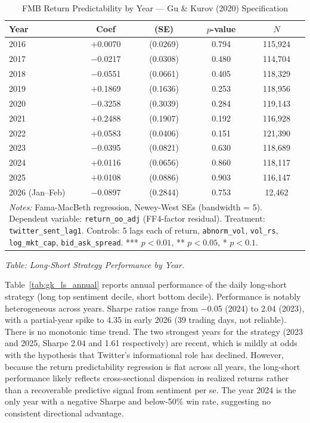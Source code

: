 \documentclass[12pt]{article}
\begin{document}
\begin{table}[htbp]
\centering
\caption{FMB Return Predictability by Year --- Gu \& Kurov (2020) Specification}
\label{tab:gk_fmb_annual}
\begin{tabular}{lcccc}
\hline\hline
Year & Coef & (SE) & $p$-value & $N$ \\
\hline
  2016 & $+$0.0070 & (0.0269) & 0.794 & 115,924 \\
  2017 & $-$0.0217 & (0.0308) & 0.480 & 114,704 \\
  2018 & $-$0.0551 & (0.0661) & 0.405 & 118,329 \\
  2019 & $+$0.1869 & (0.1636) & 0.253 & 118,956 \\
  2020 & $-$0.3258 & (0.3039) & 0.284 & 119,143 \\
  2021 & $+$0.2488 & (0.1907) & 0.192 & 116,928 \\
  2022 & $+$0.0583 & (0.0406) & 0.151 & 121,390 \\
  2023 & $-$0.0395 & (0.0821) & 0.630 & 118,689 \\
  2024 & $+$0.0116 & (0.0656) & 0.860 & 118,117 \\
  2025 & $+$0.0108 & (0.0886) & 0.903 & 116,147 \\
  2026 (Jan--Feb) & $-$0.0897 & (0.2844) & 0.753 & 12,462 \\
\hline\hline
\multicolumn{5}{p{0.9\linewidth}}{\footnotesize \textit{Notes:} Fama-MacBeth regression, Newey-West SEs (bandwidth = 5).
Dependent variable: \texttt{return\_oo\_adj} (FF4-factor residual).
Treatment: \texttt{twitter\_sent\_lag1}. Controls: 5 lags each of return,
\texttt{abnorm\_vol}, \texttt{vol\_rs}, \texttt{log\_mkt\_cap}, \texttt{bid\_ask\_spread}.
*** $p<0.01$, ** $p<0.05$, * $p<0.1$.}
\end{tabular}
\end{table}

\medskip

\noindent\textit{Table: Long-Short Strategy Performance by Year.}

Table~\ref{tab:gk_ls_annual} reports annual performance of the daily long-short strategy (long
top sentiment decile, short bottom decile). Performance is notably heterogeneous across years.
Sharpe ratios range from $-$0.05 (2024) to 2.04 (2023), with a partial-year spike to 4.35 in
early 2026 (39 trading days, not reliable). There is no monotonic time trend. The two strongest
years for the strategy (2023 and 2025, Sharpe 2.04 and 1.61 respectively) are recent, which is
mildly at odds with the hypothesis that Twitter's informational role has declined. However,
because the return predictability regression is flat across all years, the long-short performance
likely reflects cross-sectional dispersion in realized returns rather than a recoverable
predictive signal from sentiment per se. The year 2024 is the only year with a negative Sharpe
and below-50\% win rate, suggesting no consistent directional advantage.
\end{document}
